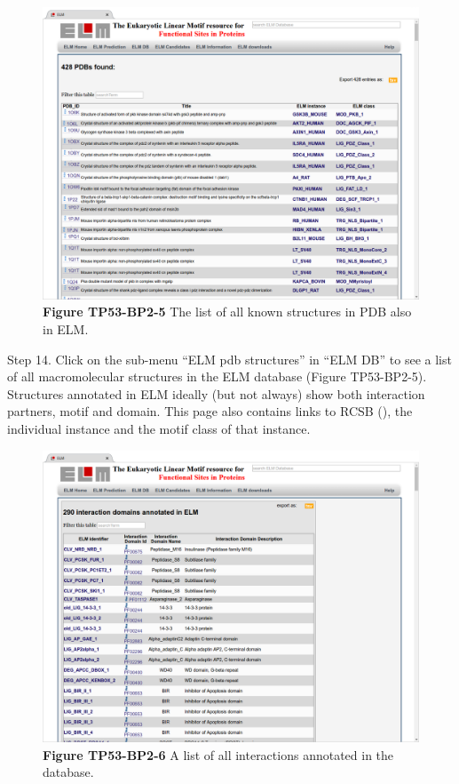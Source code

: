 \begin{figure}[h!]
\centering
\includegraphics[width=\textwidth]{Figures/TP53_2/pdbs.png} 
\caption{
\textbf{Figure TP53-BP2-5}
The list of all known structures in PDB also in ELM.
}
\end{figure}

Step 14. Click on the sub-menu ``ELM pdb structures'' in ``ELM DB'' to
see a list of all macromolecular structures in the ELM database (Figure
TP53-BP2-5). Structures annotated in ELM ideally (but not always) show
both interaction partners, motif and domain. This page also contains
links to RCSB (\cite{12037327}), the individual instance and the motif
class of that instance.


\begin{figure}[h!]
\centering
\includegraphics[width=\textwidth]{Figures/TP53_2/interactiondomains.png}
\caption{
\textbf{Figure TP53-BP2-6} A list of all interactions annotated in the
database.
}
\end{figure}

